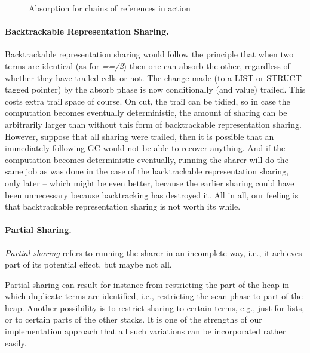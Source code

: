 \documentclass{tlp}
\begin{document}
\begin{figure}[h]
\begin{centering}
\caption{Absorption for chains of references in action}
\label{fig:chain}
\end{centering}
\end{figure}



\paragraph{\bf Backtrackable Representation Sharing.}\label{backtrackablerepshar}

Backtrackable representation sharing would follow the principle that when
two terms are identical (as for {\em ==/2}) then one can absorb the other,
regardless of whether they have trailed cells or not.  The change made
(to a LIST or STRUCT-tagged pointer) by the absorb phase is now
conditionally (and value) trailed. This costs extra trail space of
course. On cut, the trail can be tidied, so in case the computation
becomes eventually deterministic, the amount of sharing can be
arbitrarily larger than without this form of backtrackable
representation sharing. However, suppose that all sharing were
trailed, then it is possible that an immediately following GC would
not be able to recover anything. And if the computation becomes
deterministic eventually, running the sharer will do the same job as
was done in the case of the backtrackable representation sharing, only
later -- which might be even better, because the earlier sharing could
have been unnecessary because backtracking has destroyed it. All in
all, our feeling is that backtrackable representation sharing is not
worth its while.


\paragraph{\bf Partial Sharing.}

{\em Partial sharing} refers to running the sharer in an incomplete
way, i.e., it achieves part of its potential effect, but maybe not all.

Partial sharing can result for instance from restricting the part of
the heap in which duplicate terms are identified, i.e., restricting the
scan phase to part of the heap. Another possibility is to restrict
sharing to certain terms, e.g., just for lists, or to certain parts
of the other stacks. It is one of the strengths of our implementation
approach that all such variations can be incorporated rather easily.
\end{document}

